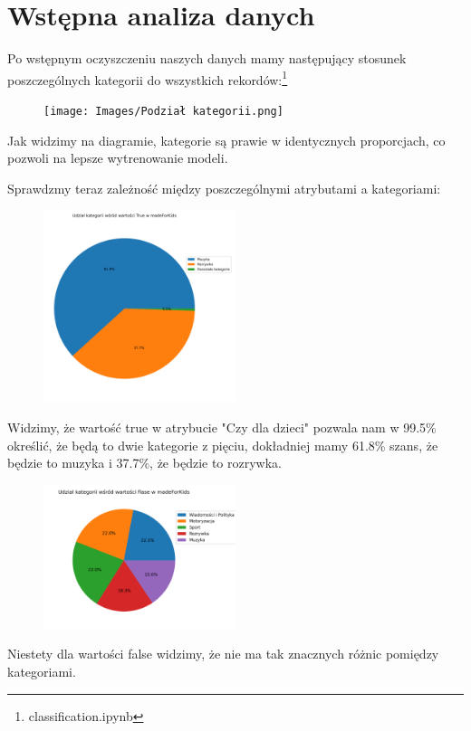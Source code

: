 \section{Wstępna analiza danych}
\hspace{\parindent}

Po wstępnym oczyszczeniu naszych danych mamy następujący stosunek poszczególnych kategorii do wszystkich rekordów:\footnote{classification.ipynb}

\begin{figure}[H]
    \centering
    \texttt{[image: Images/Podział kategorii.png]}
    \label{fig:podzial-kategorii}
\end{figure}
Jak widzimy na diagramie, kategorie są prawie w identycznych proporcjach, co pozwoli na lepsze wytrenowanie modeli.

Sprawdzmy teraz zależność między poszczególnymi atrybutami a kategoriami:

\begin{figure}[H]
    \centering
    \includegraphics[width=0.5\textwidth]{Images/Diagram_true_do_reszty.png}
    \label{fig:madeforkids-true}
\end{figure}
Widzimy, że wartość true w atrybucie "Czy dla dzieci" pozwala nam w 99.5\% określić, że będą to dwie kategorie z pięciu, dokładniej mamy 61.8\% szans, że będzie to muzyka i 37.7\%, że będzie to rozrywka.

\begin{figure}[H]
    \centering
    \includegraphics[width=0.5\textwidth]{Images/Diagram_false_do_reszty.png}
    \label{fig:madeforkids-false}
\end{figure}
Niestety dla wartości false widzimy, że nie ma tak znacznych różnic pomiędzy kategoriami.

